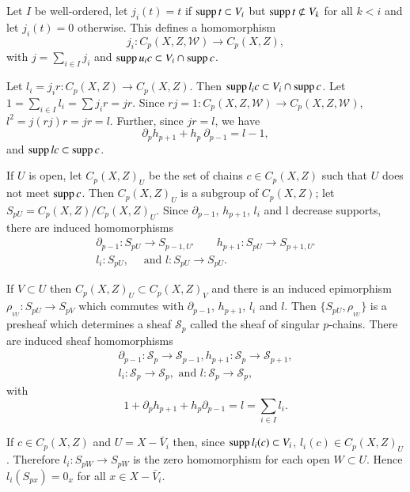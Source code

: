 Let $I$ be well-ordered, let $j_i(t) = t$ if $\operatorname{supp} t \subset V_i$ but
$\operatorname{supp} t \not \subset V_k$ for all $k < i$ and let $j_i(t) = 0$
otherwise. This defines a homomorphism 
$$
j_i : C_p (X,Z,\mathscr{W}) \rightarrow C_p (X,Z), 
$$
with $j = \sum\limits_{i \in I} j_i$ and $\operatorname{supp} u_i c \subset V_i
\cap \operatorname{supp} c$. 

Let $l_i = j_i r : C_p (X,Z) \rightarrow C_p(X,Z)$. Then $\operatorname{supp} l_i
c \subset V_i\cap \operatorname{supp} c$. Let $1 =\sum\limits_{i \in I} l_i = \sum
j_i r = j r$. Since $ r  j = 1 : C_p (X,Z, \mathscr{W})
\rightarrow C_{p} (X,Z,\mathscr{W})$, $l^2 = j(rj)r = jr = l$. Further,
since $jr = l$, we have 
$$
\partial_p  h_{p+1} + h_p ~\partial_{p-1} = l - 1, 
$$
and $\operatorname{supp} l c \subset \operatorname{supp} c $.

If $U$ is open, let $C_p(X,Z)_U$ be the set of chains $c \in C_p(X,Z)$ 
such that $U$ does not meet $\operatorname{supp} c$. Then $C_p(X,Z)_U$ is a subgroup
of $C_p(X,Z)$; let $S_{pU} = C_p(X,Z)/C_p(X,Z)_U$. Since
$\partial_{p-1}$, $h_{p+1}$, $l_i$ and l decrease supports, there are
induced homomorphisms 
\begin{gather*}
\partial_{p-1} : S_{pU} \rightarrow S_{p-1,U'} \qquad h_{p+1} : S_{pU}
\rightarrow S_{p+1,U'}\\ 
l_i : S_{pU}, \quad \text{ and }  l : S_{pU} \rightarrow S_{pU}. 
\end{gather*}\pageoriginale

If $V \subset U$ then $C_p(X,Z)_U \subset C_p(X,Z)_V$ and there is an
induced epimorphism $\rho_{_{VU}} : S_{pU} \rightarrow S_{pV}$ which
commutes with $\partial_{p-1}$, $h_{p+1}$, $l_i$  and
$l$. Then $\{S_{pU}, 
\rho_{_{VU}} \}$ is a presheaf which determines a sheaf $\mathscr{S}_p$
called the sheaf of singular $p$-chains. There are induced sheaf
homomorphisms 
\begin{gather*}
\partial_{p-1} : \mathscr{S}_{p} \rightarrow \mathscr{S}_{p-1}, h_{p+1}
: \mathscr{S}_{p} \rightarrow \mathscr{S}_{p+1},\\ 
l_i : \mathscr{S}_{p} \rightarrow \mathscr{S}_{p}, \text{ and } l :
\mathscr{S}_{p} \rightarrow \mathscr{S}_{p}, 
\end{gather*}
with
$$
1 + \partial_{p} h_{p+1} + h_p  \partial_{p-1} = l = \sum_{i \in I} 
l_i. 
$$

If $c \in C_p (X,Z)$ and $U = X -\bar{V}_i$ then, since $\operatorname{supp} l_i (c)
\subset V_i$, $l_i (c) \in C_p(X,Z)_U$. Therefore $l_i : S_{pW}
\rightarrow S_{pW}$ is the zero homomorphism for each open $W \subset
U$. Hence $l_i (S_{px}) = 0_x$ for all $x \in X - \bar{V}_i$. 

